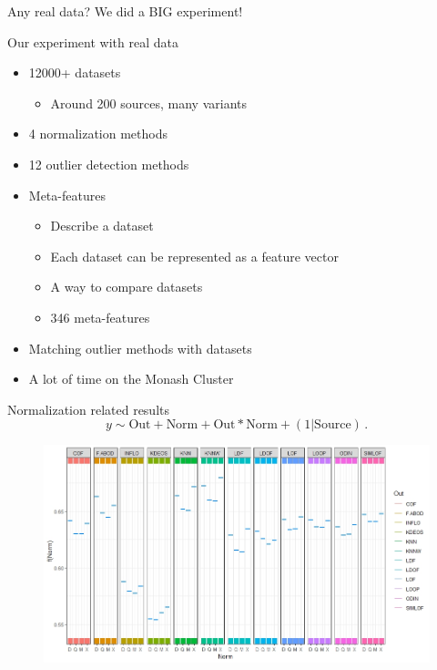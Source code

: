 \documentclass{beamer}
\begin{document}
\begin{darkframes}
    \begin{frame}{Any real data?}
        \centering
        {\huge We did a BIG experiment!}
    \end{frame}

  	\begin{frame}{Our experiment with real data}
 	\begin{itemize}
 		\item 12000+ datasets
 		\begin{itemize}
 			\item Around 200 sources, many variants
 		\end{itemize}
 		\item 4 normalization methods
 		\item 12 outlier detection methods
 		\item Meta-features
 		\begin{itemize}
 			\item Describe a dataset
 			\item Each dataset can be represented as a feature vector
 			\item A way to compare datasets
 			\item 346 meta-features
 		\end{itemize}
 		\item Matching outlier methods with datasets
 		\vspace{0.75cm}
 		\item A lot of time on the Monash Cluster 
 	\end{itemize}

 	\end{frame}	

 
 	
 	
    \begin{frame}{Normalization related results}
    \begin{equation*}
	y \sim \text{Out}  + \text{Norm} +  \text{Out} * \text{Norm} + (1|\text{Source}) \, .
\end{equation*}
    \begin{figure}\includegraphics[scale=0.4]{fit3_Norm_Effect_By_Out.jpeg}
    \end{figure}
    \end{frame}	
    

\end{darkframes}
\end{document}
